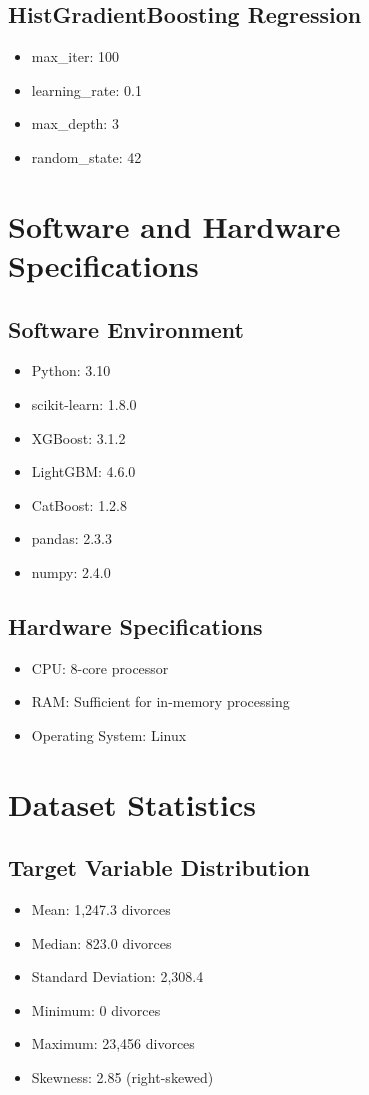 \subsection{HistGradientBoosting Regression}
\begin{itemize}
    \item max\_iter: 100
    \item learning\_rate: 0.1
    \item max\_depth: 3
    \item random\_state: 42
\end{itemize}

\section{Software and Hardware Specifications}

\subsection{Software Environment}
\begin{itemize}
    \item Python: 3.10
    \item scikit-learn: 1.8.0
    \item XGBoost: 3.1.2
    \item LightGBM: 4.6.0
    \item CatBoost: 1.2.8
    \item pandas: 2.3.3
    \item numpy: 2.4.0
\end{itemize}

\subsection{Hardware Specifications}
\begin{itemize}
    \item CPU: 8-core processor
    \item RAM: Sufficient for in-memory processing
    \item Operating System: Linux
\end{itemize}

\section{Dataset Statistics}

\subsection{Target Variable Distribution}
\begin{itemize}
    \item Mean: 1,247.3 divorces
    \item Median: 823.0 divorces
    \item Standard Deviation: 2,308.4
    \item Minimum: 0 divorces
    \item Maximum: 23,456 divorces
    \item Skewness: 2.85 (right-skewed)
\end{itemize}


